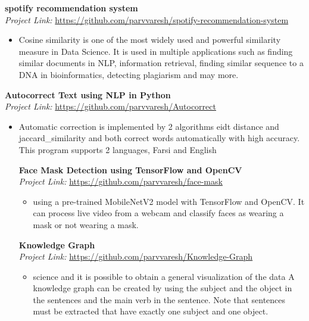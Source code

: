\documentclass[a4paper,9pt]{extarticle}
\begin{document}
\noindent
\textbf{spotify recommendation system} \hfill \\ %
\textit{Project Link:} \url{https://github.com/parvvaresh/spotify-recommendation-system} \hfill 
\begin{itemize}
    \item Cosine similarity is one of the most widely used and powerful similarity measure in Data Science. It is used in multiple applications such as finding similar documents in NLP, information retrieval, finding similar sequence to a DNA in bioinformatics, detecting plagiarism and may more. %
\end{itemize}



\noindent
\textbf{Autocorrect Text using NLP in Python} \hfill \\ %
\textit{Project Link:} \url{https://github.com/parvvaresh/Autocorrect} \hfill 
\begin{itemize}
    \item Automatic correction is implemented by 2 algorithms eidt distance and jaccard_similarity and both correct words automatically with high accuracy.
This program supports 2 languages, Farsi and English %

\noindent
\textbf{Face Mask Detection using TensorFlow and OpenCV} \hfill \\ %
\textit{Project Link:} \url{https://github.com/parvvaresh/face-mask} \hfill 
\begin{itemize}
    \item using a pre-trained MobileNetV2 model with TensorFlow and OpenCV. It can process live video from a webcam and classify faces as wearing a mask or not wearing a mask. %
\end{itemize}

\noindent
\textbf{Knowledge Graph} \hfill \\ %
\textit{Project Link:} \url{https://github.com/parvvaresh/Knowledge-Graph} \hfill 
\begin{itemize}
    \item science and it is possible to obtain a general visualization of the data A knowledge graph can be created by using the subject and the object in the sentences and the main verb in the sentence. Note that sentences must be extracted that have exactly one subject and one object. %
\end{itemize}



\end{itemize}
\end{document}

